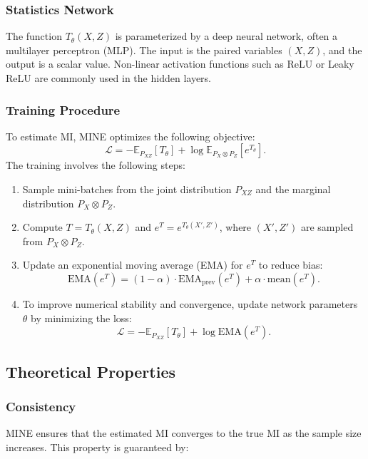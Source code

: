 \documentclass[lettersize,journal]{IEEEtran}
\begin{document}
\subsubsection{Statistics Network}
The function \( T_\theta(X, Z) \) is parameterized by a deep neural network, often a multilayer perceptron (MLP). The input is the paired variables \( (X, Z) \), and the output is a scalar value. Non-linear activation functions such as ReLU or Leaky ReLU are commonly used in the hidden layers.

\subsubsection{Training Procedure}
To estimate MI, MINE optimizes the following objective:
\begin{equation}
\mathcal{L} = -\mathbb{E}_{P_{XZ}}[T_\theta] + \log \mathbb{E}_{P_X \otimes P_Z}\left[e^{T_\theta}\right].
\end{equation}
The training involves the following steps:
\begin{enumerate}
    \item Sample mini-batches from the joint distribution \( P_{XZ} \) and the marginal distribution \( P_X \otimes P_Z \).
    \item Compute \( T = T_\theta(X, Z) \) and \( e^T = e^{T_\theta(X', Z')} \), where \( (X', Z') \) are sampled from \( P_X \otimes P_Z \).
    \item Update an exponential moving average (EMA) for \( e^T \) to reduce bias:
    \begin{equation}
    \text{EMA}(e^T) = (1 - \alpha) \cdot \text{EMA}_{\text{prev}}(e^T) + \alpha \cdot \text{mean}(e^T).
    \end{equation}
    \item To improve numerical stability and convergence, update network parameters \( \theta \) by minimizing the loss:
    \begin{equation}
    \mathcal{L} = -\mathbb{E}_{P_{XZ}}[T_\theta] + \log \text{EMA}(e^T).
    \end{equation}
\end{enumerate}

\subsection{Theoretical Properties}
\subsubsection{Consistency}
MINE ensures that the estimated MI converges to the true MI as the sample size increases. This property is guaranteed by:
\end{document}
